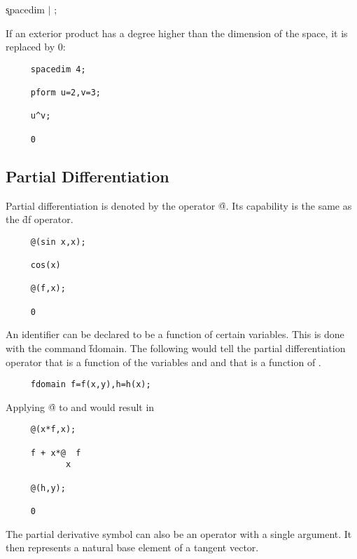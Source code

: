 \hspace*{2em} \k{spacedim}  $\mid$ ;

If an exterior product has a degree higher than the dimension of the
space, it is replaced by 0:

\begin{verbatim}
     spacedim 4;

     pform u=2,v=3;

     u^v;

     0
\end{verbatim}


\subsection{Partial Differentiation}

Partial differentiation is denoted by the operator \f{@}\label{at}.  Its
capability is the same as the {\REDUCE} \f{df} operator.
 
\hypertarget{operator:@}{}

\example{}

\begin{verbatim}
     @(sin x,x);

     cos(x)

     @(f,x);

     0
\end{verbatim}

An identifier can be declared to be a function of certain variables.
\hypertarget{command:FDOMAIN}{}
This is done with the command \f{fdomain}\label{FDOMAIN}.  The
following would tell the partial differentiation operator that 
is a function of the variables  and  and that  is
a function of .
\begin{verbatim}
     fdomain f=f(x,y),h=h(x);
\end{verbatim}
Applying \f{@} to  and  would result in
\begin{verbatim}
     @(x*f,x);

     f + x*@  f
            x

     @(h,y);

     0
\end{verbatim}

The partial derivative symbol can also be an operator with a single
argument.  It then represents a natural base element of a tangent
vector\label{at1}.

